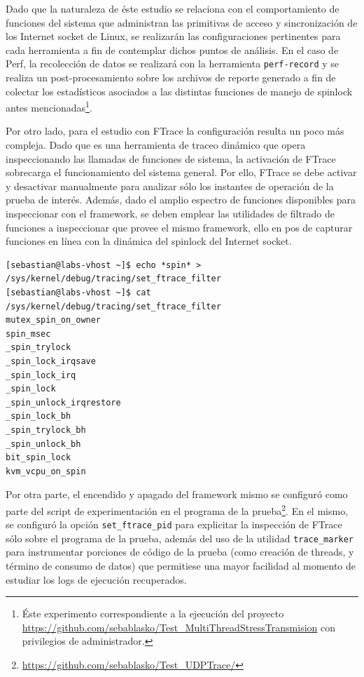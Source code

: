 Dado que la naturaleza de éste estudio se relaciona con el comportamiento de funciones del sistema que administran las primitivas de acceso y sincronización de los Internet socket de Linux, se realizarán las configuraciones pertinentes para cada herramienta a fin de contemplar dichos puntos de análisis. En el caso de Perf, la recolección de datos se realizará con la herramienta \verb=perf-record= y se realiza un post-procesamiento sobre los archivos de reporte generado a fin de colectar los estadísticos asociados a las distintas funciones de manejo de spinlock antes mencionadas\footnote{Éste experimento correspondiente a la ejecución del proyecto \url{https://github.com/sebablasko/Test_MultiThreadStressTransmision} con privilegios de administrador.}.

Por otro lado, para el estudio con FTrace la configuración resulta un poco más compleja. Dado que es una herramienta de traceo dinámico que opera inspeccionando las llamadas de funciones de sistema, la activación de FTrace sobrecarga el funcionamiento del sistema general. Por ello, FTrace se debe activar y desactivar manualmente para analizar sólo los instantes de operación de la prueba de interés. Además, dado el amplio espectro de funciones disponibles para inspeccionar con el framework, se deben emplear las utilidades de filtrado de funciones a inspeccionar que provee el mismo framework, ello en pos de capturar funciones en línea con la dinámica del spinlock del Internet socket.


\begin{lstlisting}[style=BashInputStyle, label={code:ftrace}, caption={Configuración de filtros de FTrace sobre funciones a estudiar.}, captionpos=b]
[sebastian@labs-vhost ~]$ echo *spin* > /sys/kernel/debug/tracing/set_ftrace_filter 
[sebastian@labs-vhost ~]$ cat /sys/kernel/debug/tracing/set_ftrace_filter 
mutex_spin_on_owner
spin_msec
_spin_trylock
_spin_lock_irqsave
_spin_lock_irq
_spin_lock
_spin_unlock_irqrestore
_spin_lock_bh
_spin_trylock_bh
_spin_unlock_bh
bit_spin_lock
kvm_vcpu_on_spin
\end{lstlisting}

Por otra parte, el encendido y apagado del framework mismo se configuró como parte del script de experimentación en el programa de la prueba\footnote{\url{https://github.com/sebablasko/Test_UDPTrace/}}. En el mismo, se configuró la opción \verb=set_ftrace_pid= para explicitar la inspección de FTrace sólo sobre el programa de la prueba, además del uso de la utilidad \verb=trace_marker= para instrumentar porciones de código de la prueba (como creación de threads, y término de consumo de datos) que permitiese una mayor facilidad al momento de estudiar los logs de ejecución recuperados.


